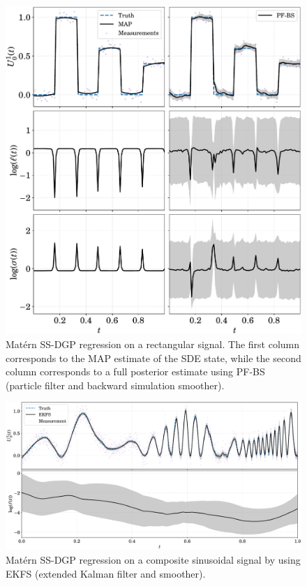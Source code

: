 \begin{figure}[t!]
	\centering
	\includegraphics[width=.9\linewidth]{figs/ssdgp-reg-rect}
	\caption{Mat\'{e}rn SS-DGP regression on a rectangular signal. The first column corresponds to the MAP estimate of the SDE state, while the second column corresponds to a full posterior estimate using PF-BS (particle filter and backward simulation smoother). }
	\label{fig:ssdgp-reg-rect}
\end{figure}
%
\begin{figure}[t!]
	\centering
	\includegraphics[width=.99\linewidth]{figs/ssdgp-reg-sine}
	\caption{Mat\'{e}rn SS-DGP regression on a composite sinusoidal signal by using EKFS (extended Kalman filter and smoother). }
	\label{fig:ssdgp-reg-sine}
\end{figure}

